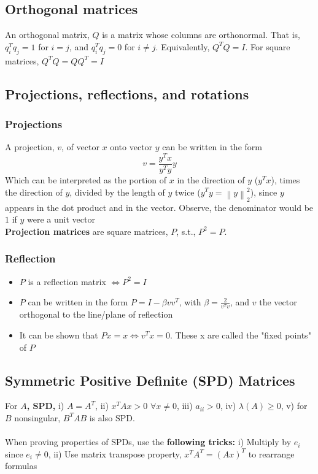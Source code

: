 \documentclass{article}
\newcommand{\norm}[2]{\left\lVert#1\right\rVert_#2}
\begin{document}
\subsection{Orthogonal matrices}
An orthogonal matrix, $Q$ is a matrix whose columns are orthonormal. That is, $q_i^Tq_j = 1$ for $i=j$, and $q_i^Tq_j = 0$ for $i\neq j$. Equivalently, $Q^TQ = I$. For square matrices, $Q^TQ = QQ^T = I$

\subsection{Projections, reflections, and rotations}
\subsubsection{Projections}
A projection, $v$, of vector $x$ onto vector $y$ can be written in the form
\begin{equation*}
    v = \frac{y^Tx}{y^Ty}y
\end{equation*}
Which can be interpreted as the portion of $x$ in the direction of $y$ ($y^Tx$), times the direction of $y$, divided by the length of $y$ twice ($y^Ty = \norm{y}{2}^2$), since $y$ appears in the dot product and in the vector. Observe, the denominator would be $1$ if $y$ were a unit vector\\

\noindent \textbf{Projection matrices} are square matrices, $P$, s.t., $P^2 = P$. 

\subsubsection{Reflection}
\begin{itemize}
    \item $P$ is a reflection matrix $\Leftrightarrow P^2 = I$
    \item $P$ can be written in the form $P = I - \beta vv^T$, with $\beta = \frac{2}{v^Tv}$, and $v$ the vector orthogonal to the line/plane of reflection
    \item It can be shown that $Px = x \Leftrightarrow v^Tx = 0$. These x are called the "fixed points" of $P$
\end{itemize}

\subsection{Symmetric Positive Definite (SPD) Matrices}
For \textbf{$A$, SPD,} i) $A = A^T$, ii) $x^TAx > 0$  $\forall x \neq 0$, iii) $a_{ii} > 0$, iv) $\lambda(A) \geq 0$, v) for $B$ nonsingular, $B^TAB$ is also SPD.\\ \\
When proving properties of SPDs, use the \textbf{following tricks:} i) Multiply by $e_i$ since $e_i \neq 0$, ii) Use matrix transpose property, $x^TA^T = (Ax)^T$ to rearrange formulas
\end{document}
